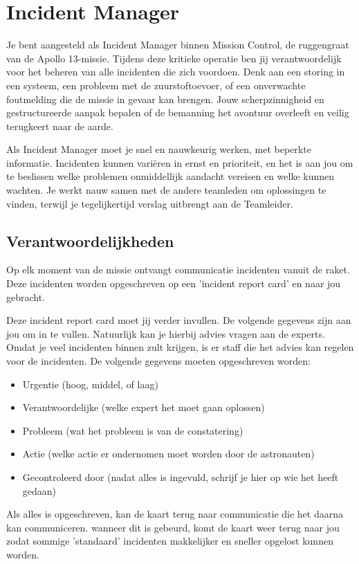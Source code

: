 \section{Incident Manager}

Je bent aangesteld als Incident Manager binnen Mission Control, de ruggengraat van de Apollo 13-missie. Tijdens deze kritieke operatie ben jij verantwoordelijk voor het beheren van alle incidenten die zich voordoen. Denk aan een storing in een systeem, een probleem met de zuurstoftoevoer, of een onverwachte foutmelding die de missie in gevaar kan brengen. Jouw scherpzinnigheid en gestructureerde aanpak bepalen of de bemanning het avontuur overleeft en veilig terugkeert naar de aarde.

Als Incident Manager moet je snel en nauwkeurig werken, met beperkte informatie. Incidenten kunnen variëren in ernst en prioriteit, en het is aan jou om te beslissen welke problemen onmiddellijk aandacht vereisen en welke kunnen wachten. Je werkt nauw samen met de andere teamleden om oplossingen te vinden, terwijl je tegelijkertijd verslag uitbrengt aan de Teamleider.

\subsection{Verantwoordelijkheden}
Op elk moment van de missie ontvangt communicatie incidenten vanuit de raket. Deze incidenten worden opgeschreven op een 'incident report card' en naar jou gebracht.

Deze incident report card moet jij verder invullen. De volgende gegevens zijn aan jou om in te vullen. Natuurlijk kan je hierbij advies vragen aan de experts. Omdat je veel incidenten binnen zult krijgen, is er staff die het advies kan regelen voor de incidenten. De volgende gegevens moeten opgeschreven worden:
\begin{itemize}
    \item Urgentie (hoog, middel, of laag)
    \item Verantwoordelijke (welke expert het moet gaan oplossen)
    \item Probleem (wat het probleem is van de constatering)
    \item Actie (welke actie er ondernomen moet worden door de astronauten)
    \item Gecontroleerd door (nadat alles is ingevuld, schrijf je hier op wie het heeft gedaan)
\end{itemize}

Als alles is opgeschreven, kan de kaart terug naar communicatie die het daarna kan communiceren. wanneer dit is gebeurd, komt de kaart weer terug naar jou zodat sommige 'standaard' incidenten makkelijker en sneller opgelost kunnen worden.